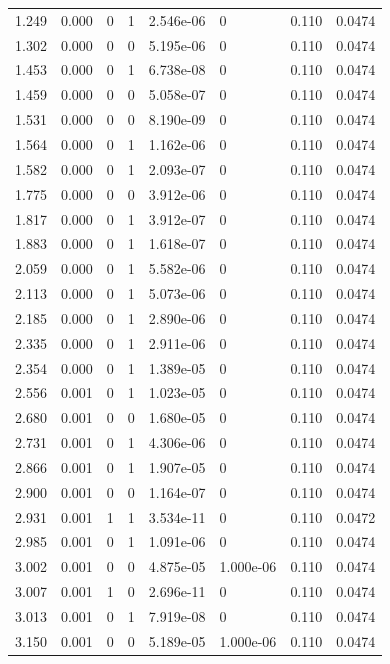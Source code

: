\documentclass[preview]{standalone}
\begin{document}
{{\begin{tabular}{L{1.2cm}C{1.2cm} C{0.3cm}C{0.5cm} C{1.4cm}C{1.4cm} C{1.4cm}C{1.4cm}}
  1.249  &  0.000  & 0     &  1 &  2.546e-06  & 0  & 0.110 &  0.0474   \\ 
  1.302  &  0.000  & 0     &  0 &  5.195e-06  & 0  & 0.110 &  0.0474   \\ 
  1.453  &  0.000  & 0     &  1 &  6.738e-08  & 0  & 0.110 &  0.0474   \\ 
  1.459  &  0.000  & 0     &  0 &  5.058e-07  & 0  & 0.110 &  0.0474   \\ 
  1.531  &  0.000  & 0     &  0 &  8.190e-09  & 0  & 0.110 &  0.0474   \\ 
  1.564  &  0.000  & 0     &  1 &  1.162e-06  & 0  & 0.110 &  0.0474   \\ 
  1.582  &  0.000  & 0     &  1 &  2.093e-07  & 0  & 0.110 &  0.0474   \\ 
  1.775  &  0.000  & 0     &  0 &  3.912e-06  & 0  & 0.110 &  0.0474   \\ 
  1.817  &  0.000  & 0     &  1 &  3.912e-07  & 0  & 0.110 &  0.0474   \\ 
  1.883  &  0.000  & 0     &  1 &  1.618e-07  & 0  & 0.110 &  0.0474   \\ 
  2.059  &  0.000  & 0     &  1 &  5.582e-06  & 0  & 0.110 &  0.0474   \\ 
  2.113  &  0.000  & 0     &  1 &  5.073e-06  & 0  & 0.110 &  0.0474   \\ 
  2.185  &  0.000  & 0     &  1 &  2.890e-06  & 0  & 0.110 &  0.0474   \\ 
  2.335  &  0.000  & 0     &  1 &  2.911e-06  & 0  & 0.110 &  0.0474   \\ 
  2.354  &  0.000  & 0     &  1 &  1.389e-05  & 0  & 0.110 &  0.0474   \\ 
  2.556  &  0.001  & 0     &  1 &  1.023e-05  & 0  & 0.110 &  0.0474   \\ 
  2.680  &  0.001  & 0     &  0 &  1.680e-05  & 0  & 0.110 &  0.0474   \\ 
  2.731  &  0.001  & 0     &  1 &  4.306e-06  & 0  & 0.110 &  0.0474   \\ 
  2.866  &  0.001  & 0     &  1 &  1.907e-05  & 0  & 0.110 &  0.0474   \\ 
  2.900  &  0.001  & 0     &  0 &  1.164e-07  & 0  & 0.110 &  0.0474   \\ 
  2.931  &  0.001  & 1     &  1 &  3.534e-11  & 0  & 0.110 &  0.0472   \\ 
  2.985  &  0.001  & 0     &  1 &  1.091e-06  & 0  & 0.110 &  0.0474   \\ 
  3.002  &  0.001  & 0     &  0 &  4.875e-05  & 1.000e-06  & 0.110 &  0.0474   \\ 
  3.007  &  0.001  & 1     &  0 &  2.696e-11  & 0  & 0.110 &  0.0474   \\ 
  3.013  &  0.001  & 0     &  1 &  7.919e-08  & 0  & 0.110 &  0.0474   \\ 
  3.150  &  0.001  & 0     &  0 &  5.189e-05  & 1.000e-06  & 0.110 &  0.0474   \\ 
\hline 
\end{tabular} 

}}
\end{document}
